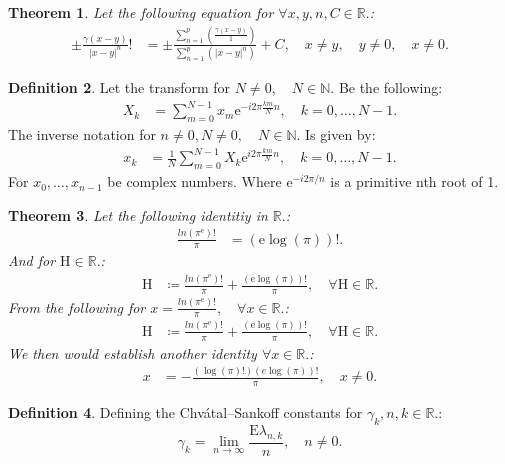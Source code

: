 \documentclass[10pt]{article}
\theoremstyle{plain}
\newtheorem{theorem}{Theorem}[section]
\theoremstyle{definition}
\newtheorem{definition}[theorem]{Definition}
\theoremstyle{remark}
\begin{document}
\begin{theorem}
	Let the following equation for $\forall x, y, n, C \in \mathbb{R}.$:
	\begin{align*}
		\pm \frac{\gamma(x-y)}{|x - y|^{n}}! &= \pm \frac{\sum_{n=1}^{p}(\frac{\gamma(x-y)}{1})}{\sum_{n=1}^{p}(|x - y|^{n})} + C, \quad x \neq y, \quad y \neq 0, \quad x \neq 0.
	\end{align*}
\end{theorem}

\begin{definition}
	Let the transform for $N \neq 0, \quad N \in \mathbb{N}.$ Be the following:
	\begin{align*}
		X_k &= \sum_{m=0}^{N-1} x_{m}\mathrm{e}^{-i2\pi \frac{km}{N}n}, \quad k = 0,\dots,N-1.
	\end{align*}
	The inverse notation for $n \neq 0, N \neq 0, \quad N \in \mathbb{N}.$ Is given by:
	\begin{align*}
		x_k &= \frac{1}{N} \sum_{m=0}^{N-1} X_k \mathrm{e}^{i2\pi \frac{km}{N}n}, \quad k = 0,\dots,N-1.
	\end{align*}
	For $x_{0}, \dots, x_{n-1}$ be complex numbers. Where $\mathrm{e}^{-i2\pi /n}$ is a primitive nth root of 1.
\end{definition}

\begin{theorem}
	Let the following identitiy in $\mathbb{R}.$:
	\begin{align*}
		\frac{ln(\pi^\mathrm{e})!}{\pi} &= (\mathrm{e} \log(\pi))!.
	\end{align*}
	And for $\mathrm{H} \in \mathbb{R}.$:
	\begin{align*}
		\mathrm{H} &\coloneq \frac{ln(\pi^\mathrm{e})!}{\pi} + \frac{(\mathrm{e} \log(\pi))!}{\pi}, \quad \forall \mathrm{H} \in \mathbb{R}.
	\end{align*}
	From the following for $x = \frac{ln(\pi^\mathrm{e})!}{\pi}, \quad \forall x \in \mathbb{R}.$:
	\begin{align*}
	\mathrm{H} &\coloneq \frac{ln(\pi^\mathrm{e})!}{\pi} + \frac{(\mathrm{e} \log(\pi))!}{\pi}, \quad \forall \mathrm{H} \in \mathbb{R}.
	\end{align*}
	We then would establish another identity $\forall x \in \mathbb{R}.$:
	\begin{align*}
		x &= -\frac{(\log(\pi)!) (e \log(\pi))!}{\pi}, \quad x \neq 0.
	\end{align*}
\end{theorem}

\begin{definition}
	Defining the Chvátal–Sankoff constants for $\gamma_k, n, k \in \mathbb{R}.$:
	\begin{equation}
		\gamma_k = \lim_{n \to \infty} \frac{\mathrm{E}{\lambda_{n, k}}}{n}, \quad n \neq 0.
	\end{equation}
\end{definition}
\end{document}
